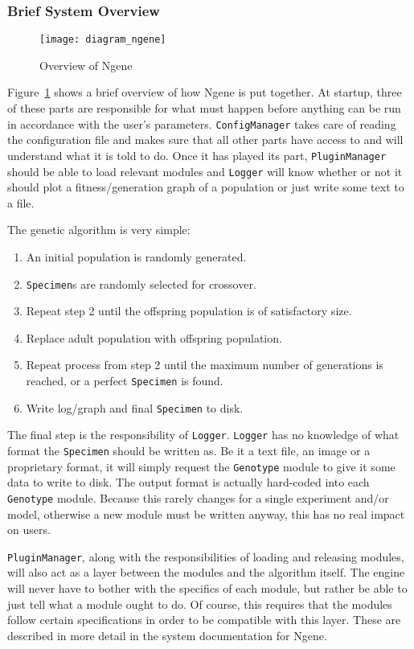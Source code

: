 \subsubsection{Brief System Overview}
\begin{figure}[!ht]
	\centering
	\texttt{[image: diagram\_ngene]}
	\caption{Overview of Ngene}
	\label{fig:diagram_ngene}
\end{figure}

Figure~\ref{fig:diagram_ngene} shows a brief overview of how Ngene is put together. At startup, three of these parts are responsible for what must happen before anything can be run in accordance with the user's parameters. \texttt{ConfigManager} takes care of reading the configuration file and makes sure that all other parts have access to and will understand what it is told to do. Once it has played its part, \texttt{PluginManager} should be able to load relevant modules and \texttt{Logger} will know whether or not it should plot a fitness/generation graph of a population or just write some text to a file.

The genetic algorithm is very simple:
\begin{enumerate}
	\itemsep=0pt
	\item An initial population is randomly generated.
	\item \texttt{Specimen}s are randomly selected for crossover.
	\item Repeat step 2 until the offspring population is of satisfactory size.
	\item Replace adult population with offspring population.
	\item Repeat process from step 2 until the maximum number of generations is reached, or a perfect \texttt{Specimen} is found.
	\item Write log/graph and final \texttt{Specimen} to disk.
\end{enumerate}

The final step is the responsibility of \texttt{Logger}. \texttt{Logger} has no knowledge of what format the \texttt{Specimen} should be written as. Be it a text file, an image or a proprietary format, it will simply request the \texttt{Genotype} module to give it some data to write to disk. The output format is actually hard-coded into each \texttt{Genotype} module. Because this rarely changes for a single experiment and/or model, otherwise a new module must be written anyway, this has no real impact on users.

\texttt{PluginManager}, along with the responsibilities of loading and releasing modules, will also act as a layer between the modules and the algorithm itself. The engine will never have to bother with the specifics of each module, but rather be able to just tell what a module ought to do. Of course, this requires that the modules follow certain specifications in order to be compatible with this layer. These are described in more detail in the system documentation for Ngene.


